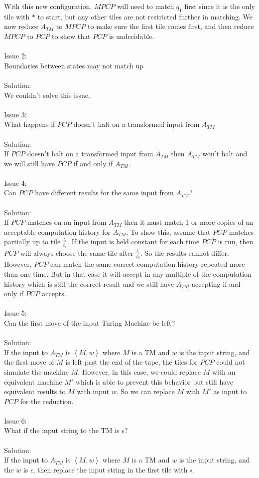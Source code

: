 \documentclass[letterpaper,notitlepage,twoside]{article}
\begin{document}
With this new configuration, $MPCP$ will need to match $q_1$ first since it is the only tile with $*$ to start, but any other tiles are not restricted further in matching. We now reduce $A_{TM}$ to $MPCP$ to make sure the first tile comes first, and then reduce $MPCP$ to $PCP$ to show that $PCP$ is undecidable.
\\\\
Issue 2:\\
Boundaries between states may not match up\\\\
Solution:\\
We couldn't solve this issue.
\\\\
Issue 3:\\
What happens if $PCP$ doesn't halt on a transformed input from $A_{TM}$\\\\
Solution:\\
If $PCP$ doesn't halt on a transformed input from $A_{TM}$ then $A_{TM}$ won't halt and we will still have $PCP$ if and only if $A_{TM}$. 
\\\\
Issue 4:\\
Can $PCP$ have different results for the same input from $A_{TM}$?\\\\
Solution:\\
If $PCP$ matches on an input from $A_{TM}$ then it must match 1 or more copies of an acceptable computation history for $A_{TM}$. To show this, assume that $PCP$  matches partially up to tile $\frac{t_i}{b_i}$. If the input is held constant for each time $PCP$ is run, then $PCP$ will always choose the same tile after $\frac{t_i}{b_i}$. So the results cannot differ. However, $PCP$ can match the same correct computation history repeated more than one time. But in that case it will accept in any multiple of the computation history which is still the correct result and we still have $A_{TM}$ accepting if and only if $PCP$ accepts.
\\\\
Issue 5:\\
Can the first move of the input Turing Machine be left?\\\\
Solution:\\
If the input to $A_{TM}$ is $\left<M,w\right>$ where $M$ is a TM and $w$ is the input string, and the first move of $M$ is left past the end of the tape, the tiles for $PCP$ could not simulate the machine $M$. However, in this case, we could replace $M$ with an equivalent machine $M'$ which is able to prevent this behavior but still have equivalent results to $M$ with input $w$. So we can replace $M$ with $M'$ as input to $PCP$ for the reduction.
\\\\
Issue 6:\\
What if the input string to the TM is $\epsilon$?\\\\
Solution:\\
If the input to $A_{TM}$ is $\left<M,w\right>$ where $M$ is a TM and $w$ is the input string, and the $w$ is $\epsilon$, then replace the input string in the first tile with $\square$.
\end{document}
